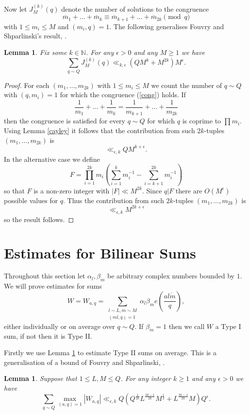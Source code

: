 \documentclass[12pt]{article}
\newcommand{\N}{\mathbb N}
\newcommand{\twosum}[2]{\sum_{\substack{#1\\#2}}}
\newtheorem{lem}[defn]{Lemma}
\begin{document}
Now let $J^{(k)}_M(q)$ denote the number of solutions to the congruence 
\begin{equation}\label{cong}
\overline m_1+\ldots+\overline m_k\equiv \overline m_{k+1}+\ldots+\overline m_{2k}\pmod q
\end{equation}
with $1\leq m_i\leq M$ and $(m_i,q)=1$. The following generalises
Fouvry and Shparlinski's result, \cite[Lemma 3]{foushpar}. 

\begin{lem}\label{cayleycong}
Fix some $k\in\N$.  For any $\epsilon>0$ and any $M\geq 1$ we have 
$$\sum_{q\sim Q}J^{(k)}_M(q)\ll_{k,\epsilon} (QM^k+M^{2k})M^\epsilon.$$ 
\end{lem} 
\begin{proof}
For each $(m_1,\ldots,m_{2k})$ with $1\leq m_i\leq M$ we count the number of $q\sim Q$ with $(q,m_i)=1$ for which the congruence (\ref{cong}) holds.  If 
$$\frac{1}{m_1}+\ldots+\frac{1}{m_k}=\frac{1}{m_{k+1}}+\ldots+\frac{1}{m_{2k}}$$
then the congruence is satisfied for every $q\sim Q$ for which
$q$ is coprime to $\prod m_i$.  Using Lemma \ref{cayley} it follows that the contribution 
from such $2k$-tuples $(m_1,\ldots,m_{2k})$ is
$$\ll_{\epsilon,k}QM^{k+\epsilon}.$$ 
In the alternative case we define 
$$F=\prod_{i=1}^{2k}m_i(\sum_{i=1}^k m_i^{-1}-\sum_{i=k+1}^{2k}m_i^{-1})$$
so that $F$ is a non-zero integer with $|F|\ll M^{2k}$.  Since $q|F$ there are $O(M^\epsilon)$ possible values for $q$.  Thus the contribution from such $2k$-tuples $(m_1,\ldots,m_{2k})$ is 
$$\ll_{\epsilon,k}M^{2k+\epsilon}$$
so the result follows.
\end{proof}

\section{Estimates for Bilinear Sums}

Throughout this section let $\alpha_l,\beta_m$ be arbitrary complex
numbers bounded by $1$.  We will prove  estimates for sums
$$W=W_{a,q}=\twosum{l\sim L,m\sim M}{(ml,q)=1}\alpha_l\beta_me(\frac{a\overline{lm}}{q}),$$ 
either individually or on average over $q\sim Q$.  If $\beta_m=1$ then
we call $W$ a Type I sum, if not then it is Type II. 

Firstly we use Lemma \ref{cayleycong} to estimate Type II sums on average.  This is a generalisation of a bound of Fouvry and Shparlinski, \cite[Corollary 5]{foushpar}.

\begin{lem}\label{typeiimax}
Suppose that $1\leq L,M\leq Q$.  For any integer $k\geq 1$ and any $\epsilon>0$ we have 
$$\sum_{q\sim Q}\max_{(a,q)=1}|W_{a,q}|\ll_{\epsilon,k} Q(Q^{\frac{1}{2k}}L^{\frac{2k-1}{2k}}M^{\frac{1}{2}}+L^{\frac{2k-1}{2k}}M)Q^\epsilon.$$
\end{lem} 
\end{document}
